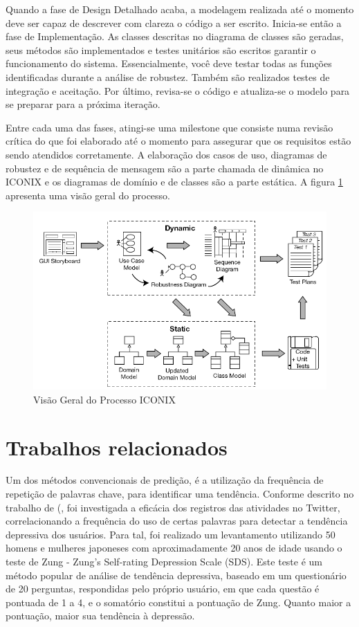 \documentclass[
	12pt,				%
	openright,			%
	oneside,			%
	a4paper,			%
	english,			%
	spanish,			%
	brazil				%
	]{abntex2}
\begin{document}
	Quando a fase de Design Detalhado acaba, a modelagem realizada até o momento deve ser capaz de descrever com clareza o código a ser escrito. Inicia-se então a fase de Implementação. As classes descritas no diagrama de classes são geradas, seus métodos são implementados e testes unitários são escritos garantir o funcionamento do sistema. Essencialmente, você deve testar todas as funções identificadas durante a análise de robustez. \cite{iconix} Também são realizados testes de integração e aceitação. Por último, revisa-se o código e atualiza-se o modelo para se preparar para a próxima iteração.  
	
	Entre cada uma das fases, atingi-se uma milestone que consiste numa revisão crítica do que foi elaborado até o momento para assegurar que os requisitos estão sendo atendidos corretamente. A elaboração dos casos de uso, diagramas de robustez e de sequência de mensagem são a parte chamada de dinâmica no ICONIX e os diagramas de domínio e de classes são a parte estática. A figura \ref{iconix_diagram} apresenta uma visão geral do processo.
	
\begin{figure}[!htb]
\centering
\includegraphics[scale=0.5]{iconix}
\caption{Visão Geral do Processo ICONIX \cite{iconix}}
\label{iconix_diagram}
\end{figure}

\section{Trabalhos relacionados}

	Um dos métodos convencionais de predição, é a utilização da frequência de repetição de palavras chave, para identificar uma tendência. Conforme descrito no trabalho de \citeauthor{article_Tsugawa2013} (\citeyear{article_Tsugawa2013}, foi investigada a eficácia dos registros das atividades no Twitter, correlacionando a frequência do uso de certas palavras para detectar a tendência depressiva dos usuários. Para tal, foi realizado um levantamento utilizando 50 homens e mulheres japoneses com aproximadamente 20 anos de idade usando o teste de Zung - Zung’s Self-rating Depression Scale (SDS). Este teste é um método popular de análise de tendência depressiva, baseado em um questionário de 20 perguntas, respondidas pelo próprio usuário, em que cada questão é pontuada de 1 a 4, e o somatório constitui a pontuação de Zung. Quanto maior a pontuação, maior sua tendência à depressão. 
	
\end{document}
